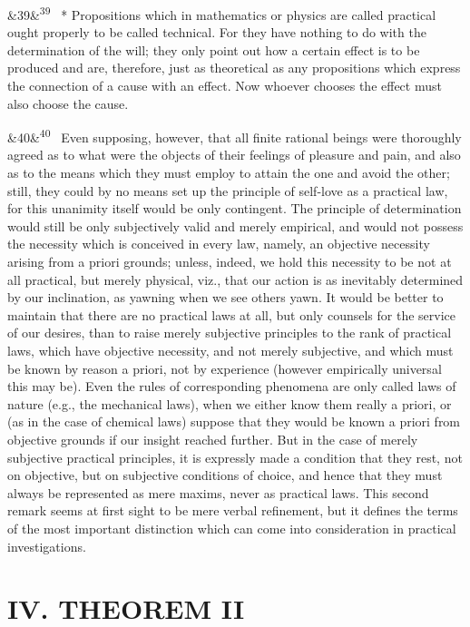 \documentclass[12pt]{article}
\newcommand{\para}[1][]{\par\noindent\ifx&#1&\else\textsuperscript{\footnotesize #1}~\fi}
\begin{document}
\para[39] * Propositions which in mathematics or physics are called practical ought properly to be called technical. For they have nothing to do with the determination of the will; they only point out how a certain effect is to be produced and are, therefore, just as theoretical as any propositions which express the connection of a cause with an effect. Now whoever chooses the effect must also choose the cause.

\para[40] Even supposing, however, that all finite rational beings were thoroughly agreed as to what were the objects of their feelings of pleasure and pain, and also as to the means which they must employ to attain the one and avoid the other; still, they could by no means set up the principle of self-love as a practical law, for this unanimity itself would be only contingent. The principle of determination would still be only subjectively valid and merely empirical, and would not possess the necessity which is conceived in every law, namely, an objective necessity arising from a priori grounds; unless, indeed, we hold this necessity to be not at all practical, but merely physical, viz., that our action is as inevitably determined by our inclination, as yawning when we see others yawn. It would be better to maintain that there are no practical laws at all, but only counsels for the service of our desires, than to raise merely subjective principles to the rank of practical laws, which have objective necessity, and not merely subjective, and which must be known by reason a priori, not by experience (however empirically universal this may be). Even the rules of corresponding phenomena are only called laws of nature (e.g., the mechanical laws), when we either know them really a priori, or (as in the case of chemical laws) suppose that they would be known a priori from objective grounds if our insight reached further. But in the case of merely subjective practical principles, it is expressly made a condition that they rest, not on objective, but on subjective conditions of choice, and hence that they must always be represented as mere maxims, never as practical laws. This second remark seems at first sight to be mere verbal refinement, but it defines the terms of the most important distinction which can come into consideration in practical investigations.

\section*{IV. THEOREM II}
\end{document}

